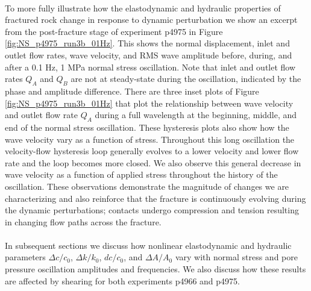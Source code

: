 \paragraph{}
To more fully illustrate how the elastodynamic and hydraulic properties of fractured rock change in response to dynamic perturbation we show an excerpt from the post-fracture stage of experiment p4975 in Figure \ref{fig:NS_p4975_run3b_01Hz}. This shows the normal displacement, inlet and outlet flow rates, wave velocity, and RMS wave amplitude before, during, and after a 0.1 Hz, 1 MPa normal stress oscillation. Note that inlet and outlet flow rates $ Q_A $ and $ Q_B $ are not at steady-state during the oscillation, indicated by the phase and amplitude difference. There are three inset plots of Figure \ref{fig:NS_p4975_run3b_01Hz} that plot the relationship between wave velocity and outlet flow rate $ Q_A $ during a full wavelength at the beginning, middle, and end of the normal stress oscillation. These hysteresis plots also show how the wave velocity vary as a function of stress. Throughout this long oscillation the velocity-flow hysteresis loop generally evolves to a lower velocity and lower flow rate and the loop becomes more closed. We also observe this general decrease in wave velocity as a function of applied stress throughout the history of the oscillation. These observations demonstrate the magnitude of changes we are characterizing and also reinforce that the fracture is continuously evolving during the dynamic perturbations; contacts undergo compression and tension resulting in changing flow paths across the fracture. 
\paragraph{}
In subsequent sections we discuss how nonlinear elastodynamic and hydraulic parameters $\Delta c/c_0$, $ \Delta k/k_0 $, $dc/c_0$, and $\Delta A/A_0$ vary with normal stress and pore pressure oscillation amplitudes and frequencies. We also discuss how these results are affected by shearing for both experiments p4966 and p4975. 


